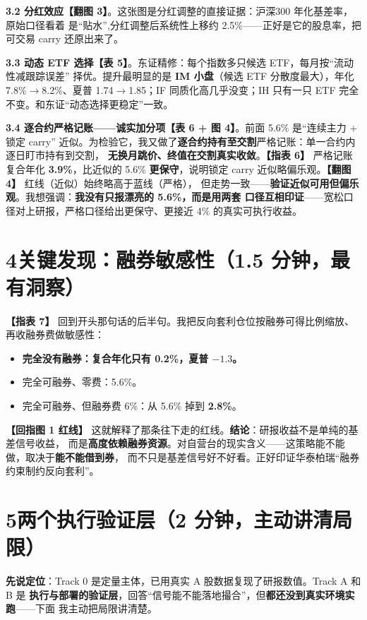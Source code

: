 \documentclass[11pt]{ctexart}
\newcommand{\cue}[1]{{\color{cue}\textbf{【#1】}}}
\begin{document}
\textbf{3.2 分红效应}\cue{翻图 3}。这张图是分红调整的直接证据：沪深300 年化基差率，原始口径看着
是``贴水'',分红调整后系统性上移约 2.5\%——正好是它的股息率，把可交易 carry 还原出来了。

\textbf{3.3 动态 ETF 选择}\cue{表 5}。东证精修：每个指数多只候选 ETF，每月按``流动性减跟踪误差''
择优。提升最明显的是 \textbf{IM 小盘}（候选 ETF 分散度最大），年化 7.8\%$\to$8.2\%、夏普
1.74$\to$1.85；IF 同质化高几乎没变；IH 只有一只 ETF 完全不变。和东证``动态选择更稳定''一致。

\textbf{3.4 逐合约严格记账——诚实加分项}\cue{表 6 + 图 4}。前面 5.6\% 是``连续主力 $+$ 锁定 carry''
近似。为检验它，我又做了\textbf{逐合约持有至交割}严格记账：单一合约内逐日盯市持有到交割，
\textbf{无换月跳价、终值在交割真实收敛}。\cue{指表 6} 严格记账复合年化 \textbf{3.9\%}，比近似的
5.6\% \textbf{更保守}，说明锁定 carry 近似略偏乐观。\cue{翻图 4} 红线（近似）始终略高于蓝线（严格），
但走势一致——\textbf{验证近似可用但偏乐观}。我想强调：\textbf{我没有只报漂亮的 5.6\%，而是用两套
口径互相印证}——宽松口径对上研报，严格口径给出更保守、更接近 4\% 的真实可执行收益。

\section*{4\quad 关键发现：融券敏感性（1.5 分钟，最有洞察）\quad \cue{表 7}}
\cue{指表 7} 回到开头那句话的后半句。我把反向套利仓位按融券可得比例缩放、再收融券费做敏感性：
\begin{itemize}
  \item \textbf{完全没有融券：复合年化只有 0.2\%，夏普 $-1.3$。}
  \item 完全可融券、零费：5.6\%。
  \item 完全可融券、但融券费 6\%：从 5.6\% 掉到 \textbf{2.8\%}。
\end{itemize}
\cue{回指图 1 红线} 这就解释了那条往下走的红线。\textbf{结论}：研报收益不是单纯的基差信号收益，
而是\textbf{高度依赖融券资源}。对自营台的现实含义——这策略能不能做，取决于\textbf{能不能借到券}，
而不只是基差信号好不好看。正好印证华泰柏瑞``融券约束制约反向套利''。

\section*{5\quad 两个执行验证层（2 分钟，主动讲清局限）}
\noindent\textbf{先说定位}：Track 0 是定量主体，已用真实 A 股数据复现了研报数值。Track A 和 B 是
\textbf{执行与部署的验证层}，回答``信号能不能落地撮合''，但\textbf{都还没到真实环境实跑}——下面
我主动把局限讲清楚。
\end{document}
